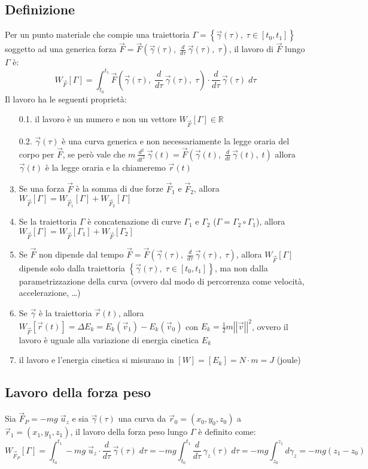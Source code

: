 \documentclass[a4paper]{article}
\newcommand\uz{\vec{u}_z}
\newcommand\ft{\vec{F}\left(\vec{\gamma}(t), \; \dt \vec{\gamma}(t), \; t\right)}
\newcommand\ftau{\vec{F}\left(\vec{\gamma}(\tau), \; \dtau \vec{\gamma}(\tau), \; \tau\right)}
\newcommand\dt{\frac{d}{dt}\,}
\newcommand\dtau{\frac{d}{d\tau}\,}
\newcommand\dts{\frac{d^2}{dt^2}\,}
\newcommand\vmod[1]{\left|\left|{#1}\right|\right|}
\begin{document}
\subsection{Definizione}
Per un punto materiale che compie una traiettoria \(\Gamma = \left\{ \vec{\gamma}(\tau), \; \tau \in \left[ t_0, t_1 \right] \right\}\)
soggetto ad una generica forza \(\displaystyle \vec{F} = \ftau\), il lavoro di \(\vec{F}\)
lungo \(\Gamma\) è:
\[W_{\vec{F}} [\Gamma] = \int_{t_0}^{t_1} \ftau \cdot \dtau \vec{\gamma}(\tau) \; d \tau\]
Il lavoro ha le seguenti proprietà:
\begin{enumerate}
	\item[0.1.] il lavoro è un numero e non un vettore \(W_{\vec{F}} [\Gamma] \in \mathbb{R}\)
	\item[0.2.] \(\vec{\gamma}(\tau)\) è una curva generica e non necessariamente la legge oraria del corpo per \(\vec{F}\), se
	però vale che \(\displaystyle m \, \dts \vec{\gamma}(t) = \ft\)
	allora \(\vec{\gamma}(t)\) è la legge oraria e la chiameremo \(\vec{r}(t)\)
	\item Se una forza \(\vec{F}\) è la somma di due forze \(\vec{F}_1\) e \(\vec{F}_2\), allora \(W_{\vec{F}}[\Gamma] = W_{\vec{F}_1}[\Gamma] + W_{\vec{F}_2}[\Gamma]\)
	\item Se la traiettoria \(\Gamma\) è concatenazione di curve \(\Gamma_1\) e \(\Gamma_2\) (\(\Gamma = \Gamma_2 \circ \Gamma_1\)),
	allora \(W_{\vec{F}}[\Gamma] = W_{\vec{F}}[\Gamma_1] + W_{\vec{F}}[\Gamma_2]\)
	\item Se \(\vec{F}\) non dipende dal tempo \(\displaystyle \vec{F} = \ftau\),
	allora \(W_{\vec{F}}[\Gamma]\) dipende solo dalla traiettoria \(\left\{ \vec{\gamma}(\tau), \; \tau \in \left[ t_0, t_1 \right] \right\}\), ma
	non dalla parametrizzazione della curva (ovvero dal modo di percorrenza come velocità, accelerazione, \dots)
	\item Se \(\vec{\gamma}\) è la traiettoria \(\vec{r}(t)\), allora \(\displaystyle W_{\vec{F}}[{\vec{r}(t)}] = \Delta E_k = E_k(\vec{v}_1) - E_k(\vec{v}_0)\)
	con \(\displaystyle E_k = \frac{1}{2} m \vmod{\vec{v}}^2\), ovvero il lavoro è uguale alla variazione di energia cinetica \(E_k\)
	\item il lavoro e l'energia cinetica si misurano in \([W] = [E_k] = N \cdot m = J\) (joule)
\end{enumerate}

\subsection{Lavoro della forza peso}
Sia \(\vec{F}_P = -mg \; \uz\) e sia \(\vec{\gamma}(\tau)\) una curva da \(\vec{r}_0 = (x_0, y_0, z_0)\) a \(\vec{r}_1 = (x_1, y_1, z_1)\),
il lavoro della forza peso lungo \(\Gamma\) è definito come:
\[W_{\vec{F}_P}[\Gamma] = \int_{t_0}^{t_1} -mg \; \uz \cdot \dtau \vec{\gamma}(\tau) \; d\tau = - mg \int_{t_0}^{t_1} \dtau \gamma_z(\tau) \; d\tau = -mg \int_{z_0}^{z_1} d\gamma_z = -mg (z_1 - z_0)\]
\end{document}
